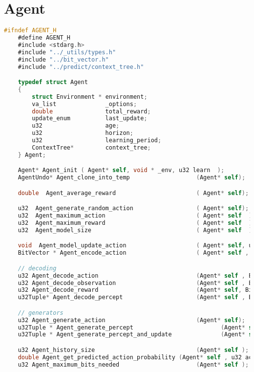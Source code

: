 \documentclass[fancychapters]{report}   	%
\begin{document}
\section{Agent}
\begin{lstlisting}[language=C,caption={agent.h}]
#ifndef AGENT_H
    #define AGENT_H
    #include <stdarg.h>
    #include "../_utils/types.h"
    #include "../bit_vector.h"
    #include "../predict/context_tree.h"

    typedef struct Agent
    {
        struct Environment * environment;
        va_list              _options;
        double               total_reward;
        update_enum          last_update;
        u32                  age;
        u32                  horizon;
        u32                  learning_period;
        ContextTree*         context_tree;
    } Agent;

    Agent* Agent_init ( Agent* self, void * _env, u32 learn  );
    AgentUndo* Agent_clone_into_temp                   (Agent* self);

    double  Agent_average_reward                       ( Agent* self);

    u32  Agent_generate_random_action                  ( Agent* self);
    u32  Agent_maximum_action                          ( Agent* self  );
    u32  Agent_maximum_reward                          ( Agent* self  );
    u32  Agent_model_size                              ( Agent* self  );

    void  Agent_model_update_action                    ( Agent* self, u32 action );
    BitVector * Agent_encode_action                    ( Agent* self , u32 action );

    // decoding
    u32 Agent_decode_action                            (Agent* self , BitVector* symbols);
    u32 Agent_decode_observation                       (Agent* self , BitVector* symbols);
    u32 Agent_decode_reward                            (Agent* self, BitVector* symbols);
    u32Tuple* Agent_decode_percept                     (Agent* self , BitVector* symbols);

    // generators
    u32 Agent_generate_action                          (Agent* self);
    u32Tuple * Agent_generate_percept                         (Agent* self );
    u32Tuple * Agent_generate_percept_and_update              (Agent* self );

    u32 Agent_history_size                             (Agent* self );
    double Agent_get_predicted_action_probability (Agent* self , u32 action);
    u32 Agent_maximum_bits_needed                      (Agent* self );


\end{lstlisting}
\end{document}
